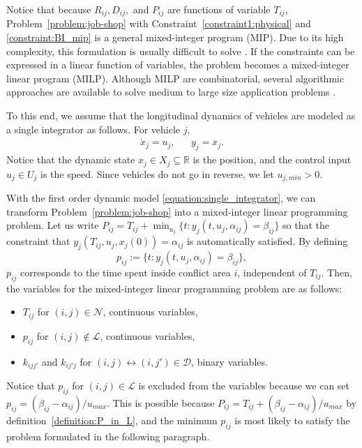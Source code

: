 \documentclass{sig-alternate}
\begin{document}
Notice that because $R_{ij}, D_{ij},$ and $P_{ij}$ are functions of variable $T_{ij}$, Problem~\ref{problem:job-shop} with Constraint~\eqref{constraint1:physical} and \eqref{constraint:BI_mip} is a general mixed-integer program (MIP). Due to its high complexity, this formulation is usually difficult to solve \cite{bussieck_minlp_2010}. If the constraints can be expressed in a linear function of variables, the problem becomes a mixed-integer linear program (MILP). Although MILP are combinatorial, several algorithmic approaches are available to solve medium to large size application problems \cite{floudas1995nonlinear}.


To this end, we assume that the longitudinal dynamics of vehicles are modeled as a single integrator as follows. For vehicle $j$,
\begin{align}\label{equation:single_integrator}
\dot{x}_j=u_j, && y_j=x_j.
\end{align}
Notice that the dynamic state $x_j\in X_j\subseteq \mathbb{R}$ is the position, and the control input $u_j\in U_j$ is the speed. Since vehicles do not go in reverse, we let $u_{j,min}>0$.  

With the first order dynamic model \eqref{equation:single_integrator}, we can transform Problem~\ref{problem:job-shop} into a mixed-integer linear programming problem.
Let us write $P_{ij}=T_{ij}+\min_{u_j} \{t:y_j(t,u_j,\alpha_{ij})=\beta_{ij}\}$ so that the constraint that $y_j(T_{ij},u_j,x_j(0))=\alpha_{ij}$ is automatically satisfied. By defining $$p_{ij}:=\{t:y_j(t,u_j,\alpha_{ij})=\beta_{ij}\},$$ $p_{ij}$ corresponds to the time spent inside conflict area $i$, independent of $T_{ij}$. Then, the variables for the mixed-integer linear programming problem are as follows:
\begin{itemize}
	\item $T_{ij}$ for $(i,j)\in\mathcal{N}$, continuous variables,
	\item $p_{ij}$ for $(i,j)\notin \mathcal{L}$, continuous variables,
	\item $k_{ijj'}$ and $k_{ij'j}$ for $(i,j)\leftrightarrow(i,j')\in\mathcal{D}$, binary variables.
\end{itemize}
Notice that $p_{ij}$ for $(i,j)\in \mathcal{L}$ is excluded from the variables because we can set $p_{ij}=(\beta_{ij}-\alpha_{ij})/u_{max}$. This is possible because $P_{ij}=T_{ij}+(\beta_{ij}-\alpha_{ij})/u_{max}$ by definition~\eqref{definition:P_in_L}, and  the minimum $p_{ij}$ is most likely to satisfy the problem formulated in the following paragraph.
\end{document}
